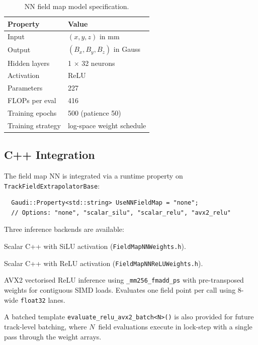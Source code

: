 \documentclass[11pt,a4paper]{article}
\begin{document}
\begin{table}[H]
\centering
\caption{NN field map model specification.}
\label{tab:nn_field_spec}
\begin{tabular}{@{} l l @{}}
\toprule
Property & Value \\
\midrule
Input    & $(x, y, z)$ in mm \\
Output   & $(B_x, B_y, B_z)$ in Gauss \\
Hidden layers & 1 $\times$ 32 neurons \\
Activation & ReLU \\
Parameters & 227 \\
FLOPs per eval & 416 \\
Training epochs & 500 (patience 50) \\
Training strategy & log-space weight schedule \\
\bottomrule
\end{tabular}
\end{table}

\subsection{C++ Integration}

The field map NN is integrated via a runtime property on
\texttt{TrackFieldExtrapolatorBase}:

\begin{verbatim}
  Gaudi::Property<std::string> UseNNFieldMap = "none";
  // Options: "none", "scalar_silu", "scalar_relu", "avx2_relu"
\end{verbatim}

Three inference backends are available:
\begin{description}[nosep]
  \item[\texttt{scalar\_silu}] Scalar C++ with SiLU activation
    (\texttt{FieldMapNNWeights.h}).
  \item[\texttt{scalar\_relu}] Scalar C++ with ReLU activation
    (\texttt{FieldMapNNReLUWeights.h}).
  \item[\texttt{avx2\_relu}] AVX2 vectorised ReLU inference using
    \texttt{\_mm256\_fmadd\_ps} with pre-transposed weights for contiguous
    SIMD loads.  Evaluates one field point per call using 8-wide
    \texttt{float32} lanes.
\end{description}

A batched template \texttt{evaluate\_relu\_avx2\_batch<N>()} is also
provided for future track-level batching, where $N$~field evaluations
execute in lock-step with a single pass through the weight arrays.
\end{document}
